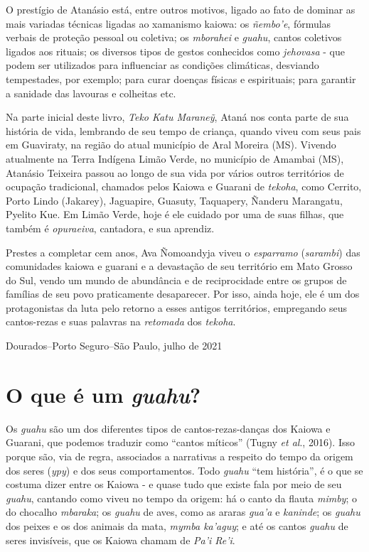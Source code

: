 O prestígio de Atanásio está, entre outros motivos, ligado ao fato de
dominar as mais variadas técnicas ligadas ao xamanismo kaiowa: os
\emph{ñembo'e}, fórmulas verbais de proteção pessoal ou coletiva; os
\emph{mborahei} e \emph{guahu}, cantos coletivos ligados aos rituais; os
diversos tipos de gestos conhecidos como \emph{jehovasa} - que podem ser
utilizados para influenciar as condições climáticas, desviando
tempestades, por exemplo; para curar doenças físicas e espirituais; para
garantir a sanidade das lavouras e colheitas etc.

Na parte inicial deste livro, \emph{Teko Katu Maraneỹ}, Ataná nos conta
parte de sua história de vida, lembrando de seu tempo de criança, quando
viveu com seus pais em Guaviraty, na região do atual município de Aral
Moreira (MS). Vivendo atualmente na Terra Indígena Limão Verde, no
município de Amambai (MS), Atanásio Teixeira passou ao longo de sua vida
por vários outros territórios de ocupação tradicional, chamados pelos
Kaiowa e Guarani de \emph{tekoha}, como Cerrito, Porto Lindo (Jakarey),
Jaguapire, Guasuty, Taquapery, Ñanderu Marangatu, Pyelito Kue. Em Limão
Verde, hoje é ele cuidado por uma de suas filhas, que também é
\emph{opuraeiva}, cantadora, e sua aprendiz.

Prestes a completar cem anos, Ava Ñomoandyja viveu o \emph{esparramo}
(\emph{sarambi}) das comunidades kaiowa e guarani e a devastação de seu
território em Mato Grosso do Sul, vendo um mundo de abundância e de
reciprocidade entre os grupos de famílias de seu povo praticamente
desaparecer. Por isso, ainda hoje, ele é um dos protagonistas da luta
pelo retorno a esses antigos territórios, empregando seus cantos-rezas e
suas palavras na \emph{retomada} dos \emph{tekoha}.

\vfill
\begin{flushright}
Dourados--Porto Seguro--São Paulo, julho de 2021
\end{flushright}

\chapter{O que é um \emph{guahu}?}

Os \emph{guahu} são um dos diferentes tipos de cantos-rezas-danças dos
Kaiowa e Guarani, que podemos traduzir como ``cantos míticos'' (Tugny
\emph{et al}., 2016). Isso porque são, via de regra, associados a
narrativas a respeito do tempo da origem dos seres (\emph{ypy}) e dos
seus comportamentos. Todo \emph{guahu} ``tem história'', é o que se
costuma dizer entre os Kaiowa - e quase tudo que existe fala por meio de
seu \emph{guahu}, cantando como viveu no tempo da origem: há o canto da
flauta \emph{mimby}; o do chocalho \emph{mbaraka}; os \emph{guahu} de
aves, como as araras \emph{gua'a} e \emph{kaninde}; os \emph{guahu} dos
peixes e os dos animais da mata, \emph{mymba ka'aguy}; e até os cantos
\emph{guahu} de seres invisíveis, que os Kaiowa chamam de \emph{Pa'i
Re'i}.

